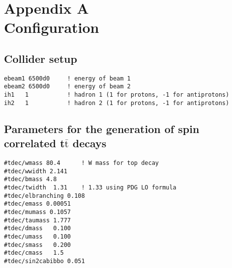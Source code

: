\cleardoublepage%
%
\chapter[Appendix A - \textsc{Powheg Box Res} t$\overline{\text{t}}$+b$\overline{\text{b}}$ Configuration]{\label{chap:apx_exp_data}Appendix A \\
{\selectfont{Powheg Box Res}} Configuration}
%
\section{Collider setup}
\begin{lstlisting}[basicstyle=\ttfamily\scriptsize,frame = single]
ebeam1 6500d0     ! energy of beam 1
ebeam2 6500d0     ! energy of beam 2
ih1   1           ! hadron 1 (1 for protons, -1 for antiprotons)
ih2   1           ! hadron 2 (1 for protons, -1 for antiprotons)
\end{lstlisting}
\section{Parameters for the generation of spin correlated t$\overline{\text{t}}$ decays}
\begin{lstlisting}[basicstyle=\ttfamily\scriptsize,frame = single]
#tdec/wmass 80.4      ! W mass for top decay
#tdec/wwidth 2.141
#tdec/bmass 4.8
#tdec/twidth  1.31    ! 1.33 using PDG LO formula
#tdec/elbranching 0.108
#tdec/emass 0.00051
#tdec/mumass 0.1057
#tdec/taumass 1.777
#tdec/dmass   0.100
#tdec/umass   0.100
#tdec/smass   0.200
#tdec/cmass   1.5
#tdec/sin2cabibbo 0.051
\end{lstlisting}
\newpage
